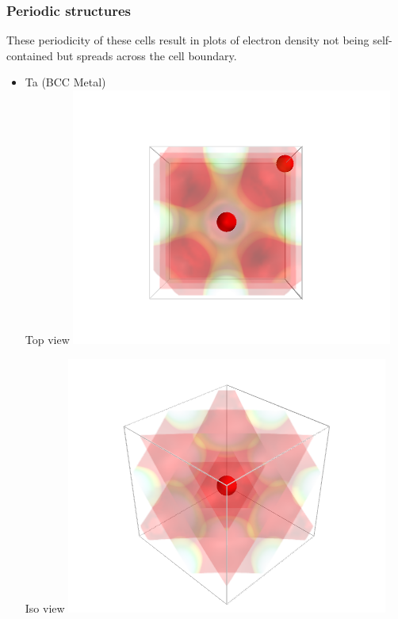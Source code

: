 \documentclass[11pt]{article}
\begin{document}
\subsubsection{Periodic structures}
\label{sec-1-6-2}


These periodicity of these cells result in plots of electron density not being self-contained but spreads across the cell boundary.
\begin{itemize}

\item Ta (BCC Metal)\\
\label{sec-1-6-2-1}%
Top view
\includegraphics[width=.9\linewidth]{./images/Ta_top.png}

Iso view
\includegraphics[width=.9\linewidth]{./images/Ta_iso.png}


\end{itemize}
\end{document}

